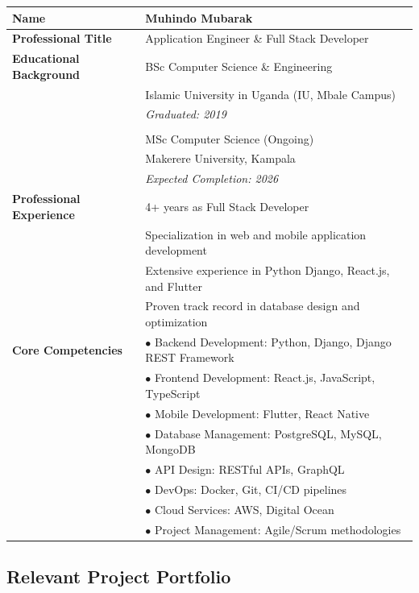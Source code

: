 \documentclass[12pt]{article}
\begin{document}
\begin{table}[h!]
\centering
\begin{tabularx}{\textwidth}{lX}
\toprule
\textbf{Name} & Muhindo Mubarak \\
\midrule
\textbf{Professional Title} & Application Engineer \& Full Stack Developer \\
\midrule
\textbf{Educational Background} & 
    BSc Computer Science \& Engineering \\
    & Islamic University in Uganda (IU, Mbale Campus) \\
    & \textit{Graduated: 2019} \\
    & \\
    & MSc Computer Science (Ongoing) \\
    & Makerere University, Kampala \\
    & \textit{Expected Completion: 2026} \\
\midrule
\textbf{Professional Experience} & 4+ years as Full Stack Developer \\
    & Specialization in web and mobile application development \\
    & Extensive experience in Python Django, React.js, and Flutter \\
    & Proven track record in database design and optimization \\
\midrule
\textbf{Core Competencies} & 
    $\bullet$ Backend Development: Python, Django, Django REST Framework \\
    & $\bullet$ Frontend Development: React.js, JavaScript, TypeScript \\
    & $\bullet$ Mobile Development: Flutter, React Native \\
    & $\bullet$ Database Management: PostgreSQL, MySQL, MongoDB \\
    & $\bullet$ API Design: RESTful APIs, GraphQL \\
    & $\bullet$ DevOps: Docker, Git, CI/CD pipelines \\
    & $\bullet$ Cloud Services: AWS, Digital Ocean \\
    & $\bullet$ Project Management: Agile/Scrum methodologies \\
\bottomrule
\end{tabularx}
\end{table}

\subsection{Relevant Project Portfolio}
\end{document}
